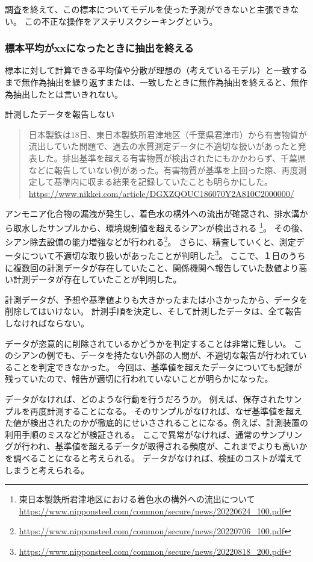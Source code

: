 調査を終えて、この標本についてモデルを使った予測ができないと主張できない。
この不正な操作をアステリスクシーキングという。


\subsubsection{標本平均がxxになったときに抽出を終える}
標本に対して計算できる平均値や分散が理想の（考えているモデル）と一致するまで無作為抽出を繰り返すまたは、一致したときに無作為抽出を終えると、無作為抽出したとは言いきれない。


\begin{SMbox}{計測したデータを報告しない}
    \begin{quote}
        日本製鉄は18日、東日本製鉄所君津地区（千葉県君津市）から有害物質が流出していた問題で、過去の水質測定データに不適切な扱いがあったと発表した。排出基準を超える有害物質が検出されたにもかかわらず、千葉県などに報告していない例があった。有害物質が基準を上回った際、再度測定して基準内に収まる結果を記録していたことも明らかにした。
        \ \ \\ \url{https://www.nikkei.com/article/DGXZQOUC186070Y2A810C2000000/}
    \end{quote}

    アンモニア化合物の漏洩が発生し、着色水の構外への流出が確認され、排水溝から取水したサンプルから、環境規制値を超えるシアンが検出される   \footnote{東日本製鉄所君津地区における着色水の構外への流出について \url{https://www.nipponsteel.com/common/secure/news/20220624_100.pdf}}。
    その後、シアン除去設備の能力増強などが行われる\footnote{\url{https://www.nipponsteel.com/common/secure/news/20220706_100.pdf}}。
    さらに、精査していくと、測定データについて不適切な取り扱いがあったことが判明した\footnote{\url{https://www.nipponsteel.com/common/secure/news/20220818_200.pdf}}。
    ここで、１日のうちに複数回の計測データが存在していたこと、関係機関へ報告していた数値より高い計測データが存在していたことが判明した。

    計測データが、予想や基準値よりも大きかったまたは小さかったから、データを削除してはいけない。
    計測手順を決定し、そして計測したデータは、全て報告しなければならない。

    データが恣意的に削除されているかどうかを判定することは非常に難しい。
    このシアンの例でも、データを持たない外部の人間が、不適切な報告が行われていることを判定できなかった。
    今回は、基準値を超えたデータについても記録が残っていたので、報告が適切に行われていないことが明らかになった。


    データがなければ、どのような行動を行うだろうか。
    例えば、保存されたサンプルを再度計測することになる。
    そのサンプルがなければ、なぜ基準値を超えた値が検出されたのかが徹底的にせいさされることになる。例えば、計測装置の利用手順のミスなどが検証される。
    ここで異常がなければ、通常のサンプリングが行われ、基準値を超えるデータが取得される頻度が、これまでよりも高いかを調べることになると考えられる。
    データがなければ、検証のコストが増えてしまうと考えられる。

    

\end{SMbox}